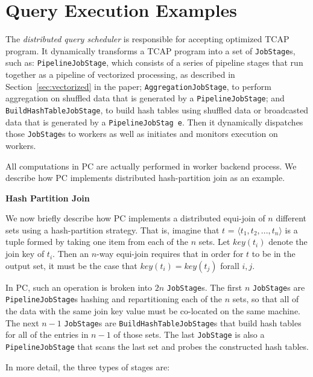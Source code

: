 
\section{Query Execution Examples}
\label{sec:implementation}

The \emph{distributed query scheduler} is responsible for accepting optimized TCAP program.
It dynamically transforms a TCAP program into a set of \texttt{JobStage}s,
such as:
\texttt{PipelineJobStage}, which consists of a series of pipeline
stages that run together as a pipeline of vectorized processing, as
described in Section~\ref{sec:vectorized} in the paper;
\texttt{AggregationJobStage}, to perform aggregation on shuffled data that is
generated by a \texttt{PipelineJobStage}; and \texttt{BuildHashTableJobStage}, to build hash
tables using shuffled data or broadcasted data that is generated by a
\texttt{PipelineJobStag e}. Then it
dynamically dispatches those \texttt{JobStage}s to workers as well as initiates and
monitors execution on workers. 

All computations in PC are actually performed in worker backend process. We
describe how PC implements distributed hash-partition join as an example.

\vspace{5pt}
\noindent
\textbf{Hash Partition Join}

We now briefly describe how PC implements a distributed equi-join of $n$ different sets using a hash-partition strategy.  
That is, imagine that $t$ = $\langle t_1, t_2, ..., t_n \rangle$ is a
tuple formed by taking one item from each of the $n$ sets.  Let $key(t_i)$ denote the join key of $t_i$.  Then an $n$-way equi-join requires that
in order for $t$ to be in the output set, it must be the case that
$key(t_i) = key(t_j)$ forall $i, j$. 

In PC, such an operation is broken into $2n$ \texttt{JobStage}s. The first $n$
\texttt{JobStage}s are \texttt{PipelineJobStage}s hashing and repartitioning each of the $n$ sets, so that all of the data with the same join key value
must be co-located on the same machine.  The next $n - 1$ \texttt{JobStage}s
are \texttt{BuildHashTableJobStage}s that build hash tables for all of the
entries in $n - 1$ of those sets.  The last \texttt{JobStage} is also a 
\texttt{PipelineJobStage} that scans the last set and
probes the constructed hash tables.  

In more detail, the three types of stages are:

